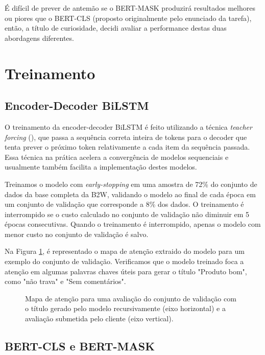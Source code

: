 \documentclass{article}
\begin{document}
É difícil de prever de antemão se o BERT-MASK produzirá resultados melhores ou piores que o BERT-CLS (proposto originalmente pelo enunciado da tarefa), então, a título de curiosidade, decidi avaliar a performance destas duas abordagens diferentes.

\section{Treinamento}

\subsection{Encoder-Decoder BiLSTM}

O treinamento da encoder-decoder BiLSTM é feito utilizando a técnica \textit{teacher forcing} (\textcite{williams1989learning}), que passa a sequência correta inteira de tokens para o decoder que tenta prever o próximo token relativamente a cada item da sequência passada. Essa técnica na prática acelera a convergência de modelos sequenciais e usualmente também facilita a implementação destes modelos.

Treinamos o modelo com \textit{early-stopping} em uma amostra de 72\% do conjunto de dados da base completa da B2W, validando o modelo ao final de cada época em um conjunto de validação que corresponde a 8\% dos dados. O treinamento é interrompido se o custo calculado no conjunto de validação não diminuir em 5 épocas consecutivas. Quando o treinamento é interrompido, apenas o modelo com menor custo no conjunto de validação é salvo.

Na Figura \ref{att_map}, é representado o mapa de atenção extraido do modelo para um exemplo do conjunto de validação. Verificamos que o modelo treinado foca a atenção em algumas palavras chaves úteis para gerar o título "Produto bom", como "não trava" e "Sem comentários".

\begin{figure}[h!]
	\scalebox{0.73}{}
	\centering
	\caption{Mapa de atenção para uma avaliação do conjunto de validação com o título gerado pelo modelo recursivamente (eixo horizontal) e a avaliação submetida pelo cliente (eixo vertical).}
	\label{att_map}
\end{figure}

\subsection{BERT-CLS e BERT-MASK}
\end{document}
